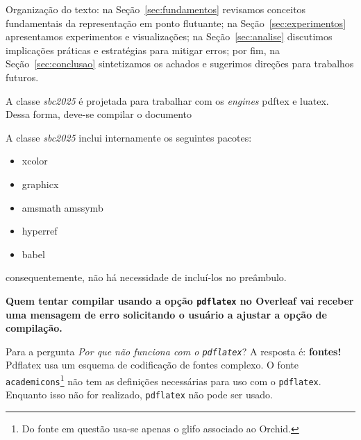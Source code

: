 Organização do texto: na Seção~\ref{sec:fundamentos} revisamos conceitos fundamentais da representação em ponto flutuante; na Seção~\ref{sec:experimentos} apresentamos experimentos e visualizações; na Seção~\ref{sec:analise} discutimos implicações práticas e estratégias para mitigar erros; por fim, na Seção~\ref{sec:conclusao} sintetizamos os achados e sugerimos direções para trabalhos futuros.

A classe \textsl{sbc2025} é projetada para trabalhar com os \textit{engines} pdftex e luatex. Dessa forma, deve-se compilar o documento 


A classe \textsl{sbc2025} inclui internamente os seguintes pacotes:
\begin{itemize}
    \item xcolor
    \item graphicx
    \item amsmath amssymb
    \item hyperref
    \item babel
\end{itemize}
\noindent consequentemente, não há necessidade de incluí-los no preâmbulo.

{\bfseries Quem tentar compilar usando a opção \texttt{pdflatex} no Overleaf vai receber uma mensagem de erro solicitando o usuário a ajustar a opção de compilação.}

Para a pergunta \textit{Por que não funciona com o \texttt{pdflatex}}?  A resposta é: \textbf{fontes!} Pdflatex usa um esquema de codificação de fontes complexo. 
O fonte \texttt{academicons}\footnote{Do fonte em questão usa-se apenas o glifo associado ao Orchid.} não tem as definições necessárias para uso com o \texttt{pdflatex}. Enquanto isso não for realizado, \texttt{pdflatex} não pode ser usado. 

